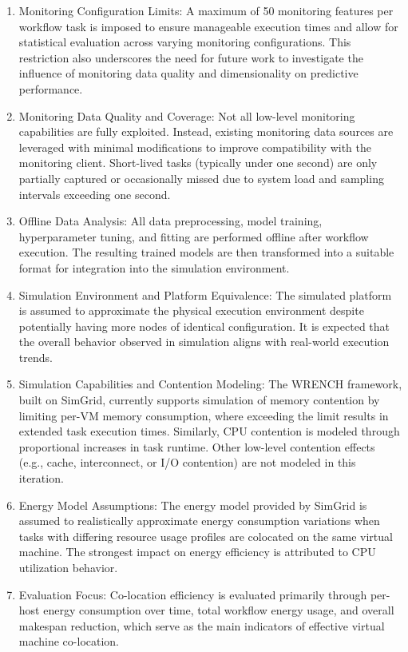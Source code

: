 \begin{enumerate}
    \item Monitoring Configuration Limits: A maximum of 50 monitoring features per workflow task is imposed to ensure manageable execution times and allow for statistical evaluation across varying monitoring configurations. This restriction also underscores the need for future work to investigate the influence of monitoring data quality and dimensionality on predictive performance.
    \item Monitoring Data Quality and Coverage: Not all low-level monitoring capabilities are fully exploited. Instead, existing monitoring data sources are leveraged with minimal modifications to improve compatibility with the monitoring client. Short-lived tasks (typically under one second) are only partially captured or occasionally missed due to system load and sampling intervals exceeding one second.
    \item Offline Data Analysis: All data preprocessing, model training, hyperparameter tuning, and fitting are performed offline after workflow execution. The resulting trained models are then transformed into a suitable format for integration into the simulation environment.
    \item Simulation Environment and Platform Equivalence: The simulated platform is assumed to approximate the physical execution environment despite potentially having more nodes of identical configuration. It is expected that the overall behavior observed in simulation aligns with real-world execution trends.
    \item Simulation Capabilities and Contention Modeling: The WRENCH framework, built on SimGrid, currently supports simulation of memory contention by limiting per-VM memory consumption, where exceeding the limit results in extended task execution times. Similarly, CPU contention is modeled through proportional increases in task runtime. Other low-level contention effects (e.g., cache, interconnect, or I/O contention) are not modeled in this iteration.
    \item Energy Model Assumptions: The energy model provided by SimGrid is assumed to realistically approximate energy consumption variations when tasks with differing resource usage profiles are colocated on the same virtual machine. The strongest impact on energy efficiency is attributed to CPU utilization behavior.
    \item Evaluation Focus: Co-location efficiency is evaluated primarily through per-host energy consumption over time, total workflow energy usage, and overall makespan reduction, which serve as the main indicators of effective virtual machine co-location.
\end{enumerate}

